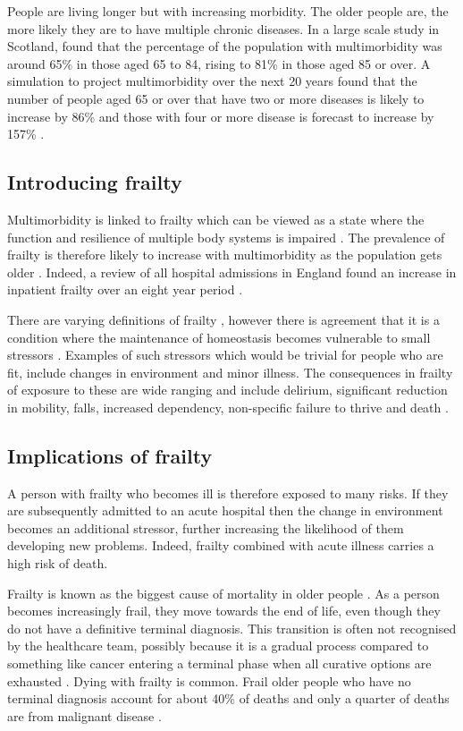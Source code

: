 \documentclass
[
	12pt,
	a4paper,
	oneside,
]{report}
\begin{document}
People are living longer but with increasing morbidity. The older people are, 
the more
likely they are to have multiple chronic diseases. In a large scale study in
Scotland, \textcite{barnett:12} found that the percentage of the population with 
multimorbidity was around 
65\% in those aged 65 to 84, rising to 81\% in those aged 85 or over. A simulation 
to project multimorbidity over the next 20 years found that the number of people
aged 65 or over that have two or more diseases is likely to increase by 86\% and 
those with four or more disease is forecast to increase by 157\%
\parencite{kingston:18}. 

\subsection{Introducing frailty}

Multimorbidity is linked to frailty which can be viewed as a state where 
the function and resilience of multiple body systems is impaired \parencite{woo:14}. 
The prevalence of frailty is therefore likely to increase with multimorbidity 
as the population
gets older \parencite{sharp:13}. Indeed, a review of all hospital admissions in 
England found an increase in inpatient frailty over an eight year period 
\parencite{soong:15}.

There are varying definitions of frailty \parencite{soong:15}, however there is 
agreement that it is a condition where the maintenance of homeostasis 
becomes vulnerable to small stressors \parencite{vellas:16}. Examples of such 
stressors which would be trivial for people who are fit, include changes in 
environment and minor illness. The consequences in frailty of 
exposure to these are wide ranging and include delirium, significant reduction 
in mobility, falls, increased dependency, non-specific failure to thrive and death 
\parencite{bgs:14,oliver:14,vellas:16}.

\subsection{Implications of frailty}

A person with frailty who becomes ill is therefore exposed to many risks. If
they are subsequently admitted to an acute hospital then the  
change in environment becomes an additional stressor, further increasing the 
likelihood of them developing
new problems. Indeed, frailty combined with acute illness carries a high risk 
of death.

Frailty is known as the biggest cause of mortality in older people 
\parencite{gill:10}. As a person becomes increasingly frail, they move towards 
the end of life, even 
though they do not have a definitive terminal diagnosis. This transition is
often not recognised by the healthcare team, possibly because it is a gradual process
compared to something like cancer entering a terminal phase when all curative
options are exhausted \parencite{oliver:14}. Dying with frailty is common.
Frail older people who have no terminal diagnosis account for about 40\% of 
deaths and only a quarter of deaths are from malignant disease \parencite{sharp:13}.
\end{document}
